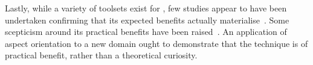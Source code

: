 Lastly, while a variety of toolsets exist for \aop{}, few studies appear to have
been undertaken confirming that its expected benefits actually
materialise~\cite{przybylek2018empirical}. Some scepticism around its practical
benefits have been
raised~\cite{steimann06paradoxical,przybylek2010wrong,Constantinides04aopconsidered}.
An application of aspect orientation to a new domain ought to demonstrate that
the technique is of practical benefit, rather than a theoretical curiosity.






